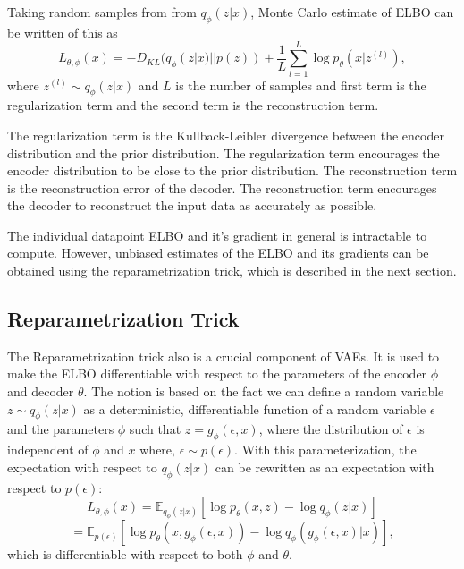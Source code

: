 Taking random samples from from $q_{\phi}(z|x)$, Monte Carlo estimate of ELBO can be written of this as
\[ L_{\theta, \phi}(x) = - D_{KL}(q_{\phi}(z|x) || p(z)) + \frac{1}{L} \sum_{l=1}^{L} \log p_{\theta}(x|z^{(l)}) ,\]
where $z^{(l)} \sim q_{\phi}(z|x)$ and $L$ is the number of samples and first term is the regularization term and the second term is the reconstruction term\cite{Kingma_2019}. 

The regularization term is the Kullback-Leibler divergence between the encoder distribution and the prior distribution. The regularization term encourages the encoder distribution to be close to the prior distribution. The reconstruction term is the reconstruction error of the decoder. The reconstruction term encourages the decoder to reconstruct the input data as accurately as possible.

The individual datapoint ELBO and it's gradient in general is intractable to compute. However, unbiased estimates of the ELBO and its gradients can be obtained using the reparametrization trick, which is described in the next section\cite{Kingma_2019}.


\subsection{Reparametrization Trick}

The Reparametrization trick also  is a crucial component of VAEs. It is used to make the ELBO differentiable with respect to the parameters of the encoder $\phi$ and decoder $\theta$. The notion is based on the fact we can define a random variable $z \sim q_{\phi}(z|x)$ as a deterministic, differentiable function of a random variable $\epsilon$ and the parameters $\phi$ such that $z = g_{\phi}(\epsilon, x)$, where the distribution of $\epsilon$ is independent of $\phi$ and $x$ where, $\epsilon \sim p(\epsilon)$. With this parameterization, the expectation with respect to $q_{\phi}(z|x)$ can be rewritten as an expectation with respect to $p(\epsilon)$: 
\[ L_{\theta, \phi}(x) = \mathbb{E}_{q_{\phi}(z|x)} [\log p_{\theta}(x, z) - \log q_{\phi}(z|x)] \]
\[ = \mathbb{E}_{p(\epsilon)} [\log p_{\theta}(x, g_{\phi}(\epsilon, x)) - \log q_{\phi}(g_{\phi}(\epsilon, x)|x)], \]
 which is differentiable with respect to both $\phi$ and $\theta$. 

